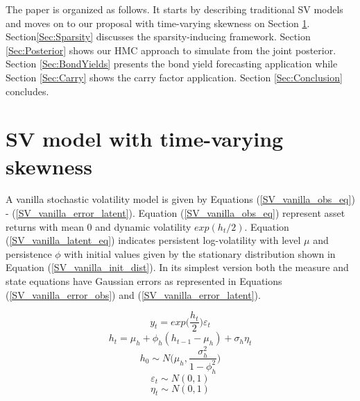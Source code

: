 \documentclass{article}
\begin{document}
The paper is organized as follows. It starts by describing traditional SV models and moves on to our proposal with time-varying skewness on Section \ref{Sec:Model}. Section\ref{Sec:Sparsity} discusses the sparsity-inducing framework. Section \ref{Sec:Posterior} shows our HMC approach to simulate from the joint posterior. Section \ref{Sec:BondYields} presents the bond yield forecasting application while Section \ref{Sec:Carry} shows the carry factor application. Section \ref{Sec:Conclusion} concludes. 
 
\section{SV model with time-varying skewness} \label{Sec:Model}

A vanilla stochastic volatility model is given by Equations (\ref{SV_vanilla_obs_eq}) - (\ref{SV_vanilla_error_latent}). Equation (\ref{SV_vanilla_obs_eq}) represent asset returns with mean 0 and dynamic volatility $exp(h_t/2)$. Equation (\ref{SV_vanilla_latent_eq}) indicates 
persistent log-volatility with level $\mu$ and persistence $\phi$ with initial values given by the stationary distribution shown in Equation (\ref{SV_vanilla_init_dist}). In its simplest version both the measure and state equations have Gaussian errors as represented in Equations (\ref{SV_vanilla_error_obs}) and (\ref{SV_vanilla_error_latent}). 

\begin{equation}\label{SV_vanilla_obs_eq}
    y_t = exp\Bigg(\frac{h_t}{2} \Bigg) \varepsilon_t  
\end{equation}
\begin{equation}\label{SV_vanilla_latent_eq}
    h_{t} = \mu_h + \phi_h (h_{t-1} - \mu_h) + \sigma_h \eta_t 
\end{equation}
\begin{equation}\label{SV_vanilla_init_dist}
        h_0 \sim N \Bigg( \mu_h, \frac{\sigma^2_h}{1 - \phi_h^2} \Bigg)
\end{equation} 
\begin{equation} \label{SV_vanilla_error_obs}
    \varepsilon_t \sim N(0,1)
\end{equation}
\begin{equation} \label{SV_vanilla_error_latent}
    \eta_t \sim N(0,1)
\end{equation}
\end{document}
